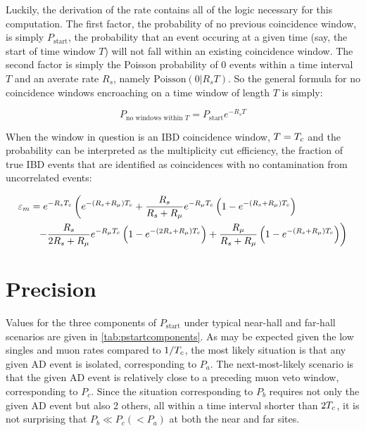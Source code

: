 Luckily, the derivation of the  rate contains all of the logic
necessary for this computation.
The first factor, the probability of no previous coincidence window,
is simply $P_{\text{start}}$, the probability that an event
occuring at a given time (say, the start of time window $T$)
will not fall within an existing coincidence window.
The second factor is simply the Poisson probability
of \num{0} events within a time interval $T$
and an averate rate $R_s$,
namely $\text{Poisson}(0\vert R_s T)$.
So the general formula for no coincidence windows encroaching
on a time window of length $T$ is simply:

\begin{equation}
    P_{\text{no windows within }T} = P_{\text{start}} e^{-R_s T}
\end{equation}

When the window in question is an IBD coincidence window,
$T = T_c$ and the probability can be interpreted as the multiplicity cut efficiency,
the fraction of true IBD events that are identified as  coincidences
with no contamination from uncorrelated events:

\begin{align}
    \label{eq:mult_eff_ap}
    \begin{split}
        \varepsilon_m &= e^{-R_s T_c}
        \left(
            e^{-(R_s + R_\mu)T_c} +
            \frac{R_s}{R_s+R_\mu} e^{-R_\mu T_c}
            \left(
                1 - e^{-(R_s + R_\mu)T_c}
            \right)
        \right. \\
              &\ \ \left. - \frac{R_s}{2R_s + R_\mu} e^{-R_\mu T_c}
                  \left(
                      1 - e^{-(2R_s + R_\mu)T_c}
                  \right) +
                  \frac{R_\mu}{R_s + R_\mu}
                  \left(
                      1 - e^{-(R_s + R_\mu)T_c}
                  \right)
              \right)
    \end{split}
\end{align}

\section{Precision}
\label{ap:singlesprecision}

Values for the three components of $P_{\text{start}}$
under typical near-hall and far-hall scenarios
are given in \cref{tab:pstartcomponents}.
As may be expected given the low singles and muon
rates compared to $1/T_c$,
the most likely situation is that any given AD event
is isolated, corresponding to $P_a$.
The next-most-likely scenario is that the given AD event
is relatively close to a preceding muon veto window,
corresponding to $P_c$.
Since the situation corresponding to $P_b$ requires
not only the given AD event but also 2 others,
all within a time interval shorter than $2T_c$,
it is not surprising that $P_b\ll P_c (< P_a)$
at both the near and far sites.

